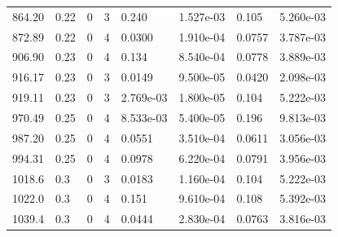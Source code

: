 \documentclass[preview]{standalone}
\begin{document}
{{{\begin{tabular}{L{1.2cm}C{1.2cm} C{0.3cm}C{0.5cm} C{1.4cm}C{1.4cm} C{1.4cm}C{1.4cm}}
  864.20  &  0.22  & 0     &  3 &  0.240  & 1.527e-03  & 0.105 &  5.260e-03   \\ 
  872.89  &  0.22  & 0     &  4 &  0.0300  & 1.910e-04  & 0.0757 &  3.787e-03   \\ 
  906.90  &  0.23  & 0     &  4 &  0.134  & 8.540e-04  & 0.0778 &  3.889e-03   \\ 
  916.17  &  0.23  & 0     &  3 &  0.0149  & 9.500e-05  & 0.0420 &  2.098e-03   \\ 
  919.11  &  0.23  & 0     &  3 &  2.769e-03  & 1.800e-05  & 0.104 &  5.222e-03   \\ 
  970.49  &  0.25  & 0     &  4 &  8.533e-03  & 5.400e-05  & 0.196 &  9.813e-03   \\ 
  987.20  &  0.25  & 0     &  4 &  0.0551  & 3.510e-04  & 0.0611 &  3.056e-03   \\ 
  994.31  &  0.25  & 0     &  4 &  0.0978  & 6.220e-04  & 0.0791 &  3.956e-03   \\ 
  1018.6  &   0.3  & 0     &  3 &  0.0183  & 1.160e-04  & 0.104 &  5.222e-03   \\ 
  1022.0  &   0.3  & 0     &  4 &  0.151  & 9.610e-04  & 0.108 &  5.392e-03   \\ 
  1039.4  &   0.3  & 0     &  4 &  0.0444  & 2.830e-04  & 0.0763 &  3.816e-03   \\ 
\hline 
\end{tabular} 

}}}
\end{document}
